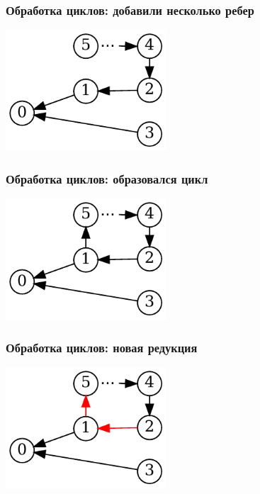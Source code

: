 \documentclass{beamer}
\begin{document}
\begin{frame}
  \transwipe[direction=90]
  \frametitle{Обработка циклов: добавили несколько ребер}
  \begin{center}                                
  \includegraphics[width=6cm]{pictures/gss_cycle/gss_cycle_no_square}
  \end{center}
\end{frame}

\begin{frame}
  \transwipe[direction=90]
  \frametitle{Обработка циклов: образовался цикл}
  \begin{center}                                
  \includegraphics[width=6cm]{pictures/gss_cycle/gss_cycle_no_red_no_highlight}
  \end{center}
\end{frame}

\begin{frame}
  \transwipe[direction=90]
  \frametitle{Обработка циклов: новая редукция}
  \begin{center}                                
  \includegraphics[width=6cm]{pictures/gss_cycle/gss_cycle_no_red}
  \end{center}
\end{frame}
\end{document}
